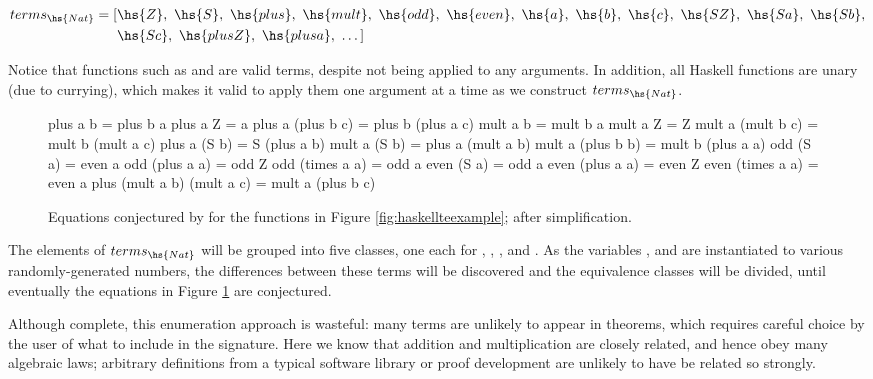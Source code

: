 \begin{align*}
  terms_{\hs{Nat}} = [& \hs{Z},\ \hs{S},\ \hs{plus},\ \hs{mult},\ \hs{odd},
                     \ \hs{even},\ \hs{a},\ \hs{b},\ \hs{c},\ \hs{S Z},
                     \ \hs{S a},\ \hs{S b}, \\
                     & \hs{S c},\ \hs{plus Z},\ \hs{plus a},\ \dots ]
\end{align*}

Notice that functions such as  and  are valid terms, despite
not being applied to any arguments. In addition, all Haskell functions are unary
(due to currying), which makes it valid to apply them one argument at a time as
we construct $terms_{\hs{Nat}}$.

\begin{figure}
  \begin{haskell}
                      plus a b = plus b a
                      plus a Z = a
             plus a (plus b c) = plus b (plus a c)
                      mult a b = mult b a
                      mult a Z = Z
             mult a (mult b c) = mult b (mult a c)
                  plus a (S b) = S (plus a b)
                  mult a (S b) = plus a (mult a b)
             mult a (plus b b) = mult b (plus a a)
                     odd (S a) = even a
                odd (plus a a) = odd Z
               odd (times a a) = odd a
                    even (S a) = odd a
               even (plus a a) = even Z
              even (times a a) = even a
    plus (mult a b) (mult a c) = mult a (plus b c)
  \end{haskell}
  \caption{Equations conjectured by \quickspec{} for the functions in Figure
    \ref{fig:haskellteexample}; after simplification.}
  \label{fig:qspecresult}
\end{figure}

The elements of $terms_{\hs{Nat}}$ will be grouped into five classes, one each
for , , ,  and
. As the variables ,  and  are instantiated to
various randomly-generated numbers, the differences between these terms will
be discovered and the equivalence classes will be divided, until eventually
the equations in Figure \ref{fig:qspecresult} are conjectured.

Although complete, this enumeration approach is wasteful: many terms are
unlikely to appear in theorems, which requires careful choice by the user of
what to include in the signature. Here we know that addition and multiplication
are closely related, and hence obey many algebraic laws; arbitrary definitions
from a typical software library or proof development are unlikely to have be
related so strongly.

